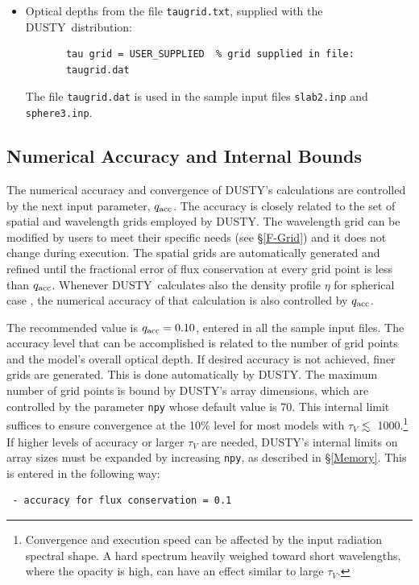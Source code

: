 \documentclass[11pt]{article}
\def\D  {{\sf DUSTY}}
\def\laa    {\mathrel{\hbox{\raise.3ex\hbox{$<$}\llap
                                {\lower.8ex\hbox{$\sim$}}}}}
\def\la     {\hbox{$\laa$}}
\def\tV     {\hbox{$\tau_V$}}
\begin{document}
\begin{enumerate}
\begin{itemize}
\item Optical depths from the file {\tt taugrid.txt}, supplied with the \D\
distribution:
\begin{verbatim}
       tau grid = USER_SUPPLIED  % grid supplied in file:
       taugrid.dat
\end{verbatim}
The file {\tt taugrid.dat} is used in the sample input files {\tt slab2.inp}
and {\tt sphere3.inp}.
\end{itemize}
\end{enumerate}

\subsection{Numerical Accuracy and Internal Bounds}
\label{numerics}

The numerical accuracy and convergence of \D's calculations are controlled by
the next input parameter, $q_{\rm acc}$. The accuracy is closely related to the
set of spatial and wavelength grids employed by \D. The wavelength grid can be
modified by users to meet their specific needs (see \S\ref{F-Grid}) and it does
not change during execution. The spatial grids are automatically generated and
refined until the fractional error of flux conservation at every grid point is
less than $q_{\rm acc}$. Whenever \D\ calculates also the density profile
$\eta$ for spherical case , the numerical accuracy of that calculation is also
controlled by $q_{\rm acc}$.

The recommended value is $q_{\rm acc} = 0.10$, entered in all the sample input
files. The accuracy level that can be accomplished is related to the number of
grid points and the model's overall optical depth. If desired accuracy is not
achieved, finer grids are generated.  This is done automatically by \D. The
maximum number of grid points is bound by \D's array dimensions, which are
controlled by the parameter {\tt npy} whose default value is 70. This internal
limit suffices to ensure convergence at the 10\% level for most models with
$\tau_V$ \la\ 1000.\footnote{Convergence and execution speed can be affected by
the input radiation spectral shape.  A hard spectrum heavily weighed toward
short wavelengths, where the opacity is high, can have an effect similar to
large \tV.} If higher levels of accuracy or larger $\tau_V$ are needed, \D's
internal limits on array sizes must be expanded by increasing {\tt npy}, as
described in \S\ref{Memory}. This is entered in the following way:
%
\begin{verbatim}
 - accuracy for flux conservation = 0.1
\end{verbatim}
\end{document}

